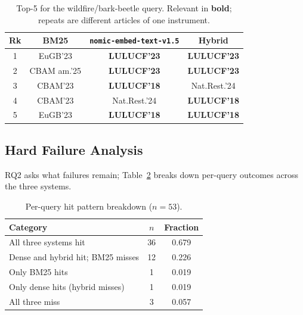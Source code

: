 \documentclass[conference,a4paper]{IEEEtran}
\newcommand{\nomic}{\texttt{nomic-embed-text-v1.5}\xspace}
\begin{document}
\begin{table}[!t]
\renewcommand{\arraystretch}{1.2}
\caption{Top-5 for the wildfire/bark-beetle query. Relevant in
  \textbf{bold}; repeats are different articles of one instrument.}
\label{tab:example}
\centering
\tiny
\begin{tabular}{@{}cccc@{}}
\toprule
Rk & BM25 & \nomic & Hybrid \\
\midrule
1 & EuGB'23 & \textbf{LULUCF'23} & \textbf{LULUCF'23} \\
2 & CBAM am.'25 & \textbf{LULUCF'23} & \textbf{LULUCF'23} \\
3 & CBAM'23 & \textbf{LULUCF'18} & Nat.Rest.'24 \\
4 & CBAM'23 & Nat.Rest.'24 & \textbf{LULUCF'18} \\
5 & EuGB'23 & \textbf{LULUCF'18} & \textbf{LULUCF'18} \\
\bottomrule
\end{tabular}
\end{table}

\subsection{Hard Failure Analysis}

RQ2 asks what failures remain; Table~\ref{tab:reliability} breaks
down per-query outcomes across the three systems.

\begin{table}[!t]
\renewcommand{\arraystretch}{1.3}
\caption{Per-query hit pattern breakdown ($n{=}53$).}
\label{tab:reliability}
\centering
\small
\begin{tabular}{@{}lcc@{}}
\toprule
Category & $n$ & Fraction \\
\midrule
All three systems hit               & 36 & 0.679 \\
Dense and hybrid hit; BM25 misses   & 12 & 0.226 \\
Only BM25 hits                      &  1 & 0.019 \\
Only dense hits (hybrid misses)     &  1 & 0.019 \\
All three miss                      &  3 & 0.057 \\
\bottomrule
\end{tabular}
\end{table}
\end{document}
